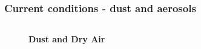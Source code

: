 \documentclass[aspectratio=169, 10pt]{beamer}
\begin{document}
\begin{frame}
\frametitle{Current conditions - dust and aerosols}

\begin{columns}
\begin{column}{0.5\textwidth}


\vspace{-1.4cm}
\begin{figure}
\textbf{Dust and Dry Air} \\
\end{figure}

\end{column}
\begin{column}{0.5\textwidth}


\end{column}
\end{columns}
\end{frame}
\end{document}
